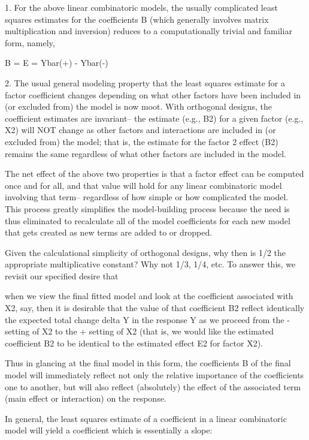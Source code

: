    1. For the above linear combinatoric
      models, the usually complicated least
      squares estimates for the coefficients B
      (which generally involves matrix
      multiplication and inversion) reduces to a
      computationally trivial and familiar form,
      namely,

            B = E = Ybar(+) - Ybar(-)

   2. The usual general modeling property that the
      least squares estimate for a factor
      coefficient changes depending on what other
      factors have been included in (or excluded
      from) the model is now moot.  With
      orthogonal designs, the coefficient
      estimates are invariant-- the estimate
      (e.g., B2) for a given factor (e.g., X2)
      will NOT change as other factors and
      interactions are included in (or excluded
      from) the model; that is, the estimate for
      the factor 2 effect (B2) remains the same
      regardless of what other factors are
      included in the model.

The net effect of the above two properties is that
a factor effect can be computed once and for all,
and that value will hold for any linear
combinatoric model involving that term--
regardless of how simple or how complicated the
model.  This process greatly simplifies the
model-building process because the need is thus
eliminated to recalculate all of the model
coefficients for each new model that gets created
as new terms are added to or dropped.

Given the calculational simplicity of orthogonal
designs, why then is 1/2 the appropriate
multiplicative constant?  Why not 1/3, 1/4, etc.
To answer this, we revisit our specified desire
that

   when we view the final fitted model
   and look at the coefficient associated with X2,
   say, then it is desirable that the value of that
   coefficient B2 reflect identically the expected
   total change delta Y in the response Y as we
   proceed from the - setting of X2 to the +
   setting of X2 (that is, we would like the
   estimated coefficient B2 to be identical to the
   estimated effect E2 for factor X2).

Thus in glancing at the final model in this form,
the coefficients B of the final model will
immediately reflect not only the relative
importance of the coefficients one to another, but
will also reflect (absolutely) the effect of the
associated term (main effect or interaction) on
the response.

In general, the least squares estimate of a
coefficient in a linear combinatoric model will
yield a coefficient which is essentially a slope:

